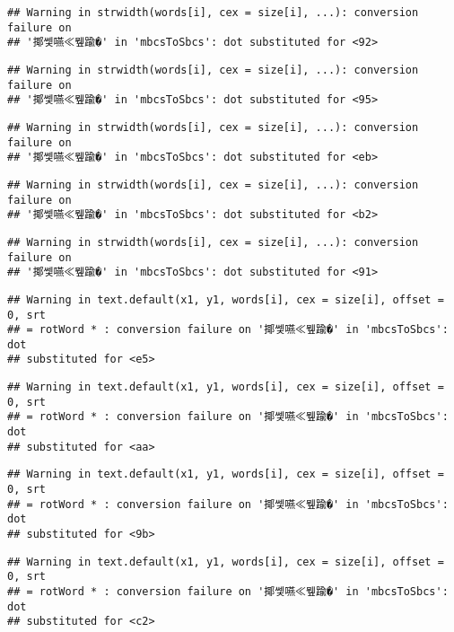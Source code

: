 \documentclass[]{article}
\begin{document}
\begin{verbatim}
## Warning in strwidth(words[i], cex = size[i], ...): conversion failure on
## '揶쎛嚥≪뮆踰�' in 'mbcsToSbcs': dot substituted for <92>
\end{verbatim}

\begin{verbatim}
## Warning in strwidth(words[i], cex = size[i], ...): conversion failure on
## '揶쎛嚥≪뮆踰�' in 'mbcsToSbcs': dot substituted for <95>
\end{verbatim}

\begin{verbatim}
## Warning in strwidth(words[i], cex = size[i], ...): conversion failure on
## '揶쎛嚥≪뮆踰�' in 'mbcsToSbcs': dot substituted for <eb>
\end{verbatim}

\begin{verbatim}
## Warning in strwidth(words[i], cex = size[i], ...): conversion failure on
## '揶쎛嚥≪뮆踰�' in 'mbcsToSbcs': dot substituted for <b2>
\end{verbatim}

\begin{verbatim}
## Warning in strwidth(words[i], cex = size[i], ...): conversion failure on
## '揶쎛嚥≪뮆踰�' in 'mbcsToSbcs': dot substituted for <91>
\end{verbatim}

\begin{verbatim}
## Warning in text.default(x1, y1, words[i], cex = size[i], offset = 0, srt
## = rotWord * : conversion failure on '揶쎛嚥≪뮆踰�' in 'mbcsToSbcs': dot
## substituted for <e5>
\end{verbatim}

\begin{verbatim}
## Warning in text.default(x1, y1, words[i], cex = size[i], offset = 0, srt
## = rotWord * : conversion failure on '揶쎛嚥≪뮆踰�' in 'mbcsToSbcs': dot
## substituted for <aa>
\end{verbatim}

\begin{verbatim}
## Warning in text.default(x1, y1, words[i], cex = size[i], offset = 0, srt
## = rotWord * : conversion failure on '揶쎛嚥≪뮆踰�' in 'mbcsToSbcs': dot
## substituted for <9b>
\end{verbatim}

\begin{verbatim}
## Warning in text.default(x1, y1, words[i], cex = size[i], offset = 0, srt
## = rotWord * : conversion failure on '揶쎛嚥≪뮆踰�' in 'mbcsToSbcs': dot
## substituted for <c2>
\end{verbatim}
\end{document}
